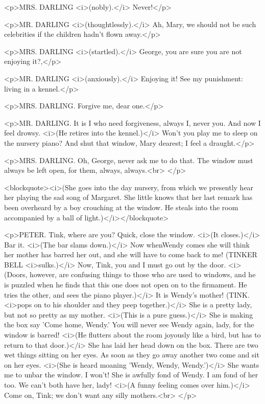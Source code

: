 <p>MRS. DARLING <i>(nobly).</i> Never!</p>

<p>MR. DARLING <i>(thoughtlessly).</i> Ah, Mary, we should not be
such celebrities if the children hadn't flown away.</p>

<p>MRS. DARLING <i>(startled).</i> George, you are sure you are not
enjoying it?,</p>

<p>MR. DARLING <i>(anxiously).</i> Enjoying it! See my punishment:
living in a kennel.</p>

<p>MRS. DARLING. Forgive me, dear one.</p>

<p>MR. DARLING. It is I who need forgiveness, always I, never you.
And now I feel drowsy. <i>(He retires into the kennel.)</i> Won't you
play me to sleep on the nursery piano? And shut that window, Mary
dearest; I feel a draught.</p>

<p>MRS. DARLING. Oh, George, never ask me to do that. The window must
always be left open, for them, always, always.<br>
</p>

<blockquote><i>(She goes into the day nursery, from which we
presently hear her playing the sad song of Margaret. She little knows
that her last remark has been overheard by a boy crouching at the
window. He steals into the room accompanied by a ball of
light.)</i></blockquote>

<p>PETER. Tink, where are you? Quick, close the window. <i>(It
closes.)</i> Bar it. <i>(The bar slams down.)</i> Now whenWendy comes
she will think her mother has barred her out, and she will have to
come back to me! (TINKER BELL <i>sulks.)</i> Now, Tink, you and I
must go out by the door. <i>(Doors, however, are confusing things to
those who are used to windows, and he is puzzled when he finds that
this one does not open on to the firmament. He tries the other, and
sees the piano player.)</i> It is Wendy's mother! (TINK. <i>pops on
to his shoulder and they peep together.)</i> She is a pretty lady,
but not so pretty as my mother. <i>(This is a pure guess.)</i> She is
making the box say 'Come home, Wendy.' You will never see Wendy
again, lady, for the window is barred! <i>(He flutters about the room
joyously like a bird, but has to return to that door.)</i> She has
laid her head down on the box. There are two wet things sitting on
her eyes. As soon as they go away another two come and sit on her
eyes. <i>(She is heard moaning 'Wendy, Wendy, Wendy.')</i> She wants
me to unbar the window. I won't! She is awfully fond of Wendy. I am
fond of her too. We can't both have her, lady! <i>(A funny feeling
comes over him.)</i> Come on, Tink; we don't want any silly
mothers.<br>
</p>

